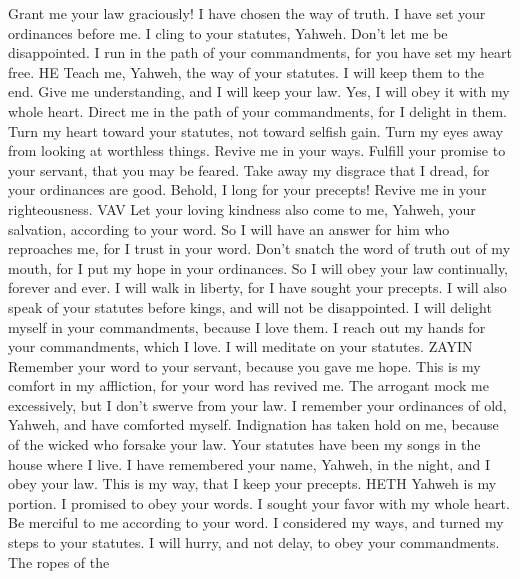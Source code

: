 Grant me your law graciously!  I have chosen the way of
truth. I have set your ordinances before me.  I cling to
your statutes, Yahweh. Don't let me be disappointed.  I run
in the path of your commandments, for you have set my heart free. HE
 Teach me, Yahweh, the way of your statutes. I will keep
them to the end.  Give me understanding, and I will keep
your law. Yes, I will obey it with my whole heart.  Direct
me in the path of your commandments, for I delight in them.
 Turn my heart toward your statutes, not toward selfish
gain.  Turn my eyes away from looking at worthless things.
Revive me in your ways.  Fulfill your promise to your
servant, that you may be feared.  Take away my disgrace
that I dread, for your ordinances are good.  Behold, I long
for your precepts! Revive me in your righteousness. VAV 
Let your loving kindness also come to me, Yahweh, your salvation,
according to your word.  So I will have an answer for him
who reproaches me, for I trust in your word.  Don't snatch
the word of truth out of my mouth, for I put my hope in your ordinances.
 So I will obey your law continually, forever and ever.
 I will walk in liberty, for I have sought your precepts.
 I will also speak of your statutes before kings, and will
not be disappointed.  I will delight myself in your
commandments, because I love them.  I reach out my hands
for your commandments, which I love. I will meditate on your statutes.
ZAYIN  Remember your word to your servant, because you gave
me hope.  This is my comfort in my affliction, for your
word has revived me.  The arrogant mock me excessively, but
I don't swerve from your law.  I remember your ordinances
of old, Yahweh, and have comforted myself.  Indignation has
taken hold on me, because of the wicked who forsake your law.
 Your statutes have been my songs in the house where I
live.  I have remembered your name, Yahweh, in the night,
and I obey your law.  This is my way, that I keep your
precepts. HETH  Yahweh is my portion. I promised to obey
your words.  I sought your favor with my whole heart. Be
merciful to me according to your word.  I considered my
ways, and turned my steps to your statutes.  I will hurry,
and not delay, to obey your commandments.  The ropes of the
